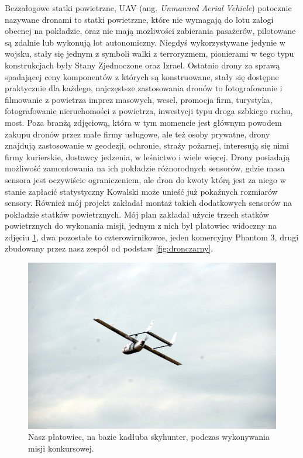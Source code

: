 Bezzałogowe statki powietrzne, UAV (ang. \textit{Unmanned Aerial Vehicle}) potocznie nazywane dronami to statki powietrzne, które nie wymagają do lotu załogi obecnej na pokładzie, oraz nie mają możliwości zabierania pasażerów, pilotowane są zdalnie lub wykonują lot autonomiczny. Niegdyś wykorzystywane jedynie w wojsku, stały się jednym z symboli walki z terroryzmem, pionierami w tego typu konstrukcjach były Stany Zjednoczone oraz Izrael. Ostatnio drony za sprawą spadającej ceny komponentów z których są konstruowane, stały się dostępne praktycznie dla każdego, najczęstsze zastosowania dronów to fotografowanie i filmowanie z powietrza imprez masowych, wesel, promocja firm, turystyka, fotografowanie nieruchomości z powietrza, inwestycji typu droga szbkiego ruchu, most. Poza branżą zdjęciową, która w tym momencie jest głównym powodem zakupu dronów przez małe firmy usługowe, ale też osoby prywatne, drony znajdują zastosowanie w geodezji, ochronie, straży pożarnej, interesują się nimi firmy kurierskie, dostawcy jedzenia, w leśnictwo i wiele więcej. Drony posiadają możliwość zamontowania na ich pokładzie różnorodnych sensorów, gdzie masa sensora jest oczywiście ograniczeniem, ale dron do kwoty którą jest za niego w stanie zapłacić statystyczny Kowalski może unieść już pokaźnych rozmiarów sensory. Również mój projekt zakładał montaż takich dodatkowych sensorów na pokładzie statków powietrznych. Mój plan zakładał użycie trzech statków powietrznych do wykonania misji, jednym z nich był płatowiec widoczny na zdjęciu \ref{fig:skyhunter}, dwa pozostałe to czterowirnikowce, jeden komercyjny Phantom 3, drugi zbudowany przez nasz zespół od podstaw \ref{fig:dronczarny}.

\begin{figure}[!th]
    \centering
    \includegraphics[width=15cm]{zalaczniki/obrazy/skyhunter.jpg}
    \caption{Nasz płatowiec, na bazie kadłuba skyhunter, podczas wykonywania misji konkursowej.}
    \label{fig:skyhunter}
\end{figure}

